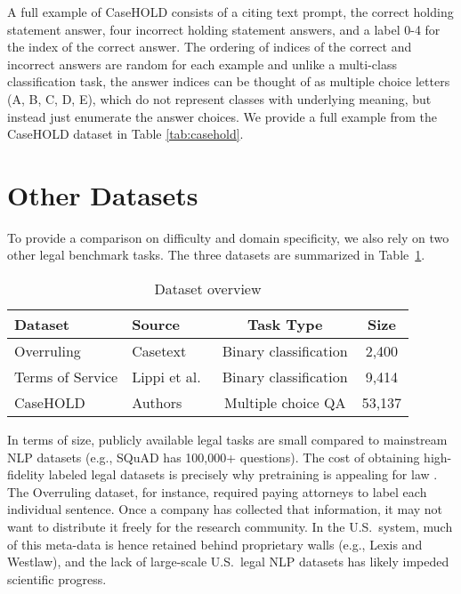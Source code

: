 \documentclass[sigconf]{acmart}
\begin{document}
A full example of CaseHOLD consists of a citing text prompt, the correct holding statement answer, four incorrect holding statement answers, and a label 0-4 for the index of the correct answer. The ordering of indices of the correct and incorrect answers are random for each example and unlike a multi-class classification task, the answer indices can be thought of as multiple choice letters (A, B, C, D, E), which do not represent classes with underlying meaning, but instead just enumerate the answer choices. We provide a full example from the CaseHOLD dataset in Table \ref{tab:casehold}.

\section{Other Datasets}
\label{sec:datasets}

To provide a comparison on difficulty and domain specificity, we also rely on two other legal benchmark tasks. The three datasets are summarized in Table~\ref{tab:datasets}. 

\begin{table}[tb!]
    \centering
    \small
    \caption{Dataset overview}
    \vspace{-0.15in}
    \begin{tabularx}{\columnwidth}{XXcc}
         \toprule
         Dataset & Source & Task Type & Size \\
         \midrule
         Overruling & Casetext & Binary classification & 2,400 \\
         Terms of Service & Lippi et al.~\cite{Lippi_2019} & Binary classification & 9,414 \\
         CaseHOLD & Authors & Multiple choice QA & 53,137 \\
         \bottomrule
    \end{tabularx}
    \label{tab:datasets}
    \vspace{-0.15in}
\end{table}

In terms of size, publicly available legal tasks are small compared to mainstream NLP datasets (e.g., SQuAD has 100,000+ questions). The cost of obtaining high-fidelity labeled legal datasets is precisely why pretraining is appealing for law \cite{engstrom2020algorithmic}.  The Overruling dataset, for instance, required paying attorneys to label each individual sentence. Once a company has collected that information, it may not want to distribute it freely for the research community.  In the U.S.\ system, much of this meta-data is hence retained behind proprietary walls (e.g., Lexis and Westlaw), and the lack of large-scale U.S.\ legal NLP datasets has likely impeded scientific progress. 
\end{document}
